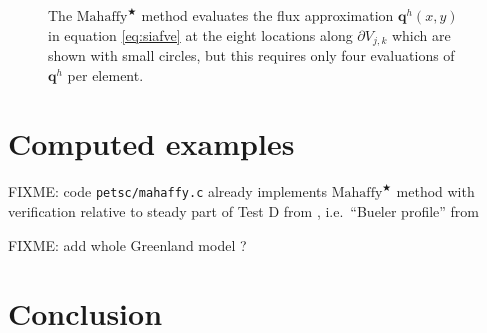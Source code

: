 \documentclass[11pt]{amsart}
\newcommand\bq{\mathbf{q}}
\newcommand{\Mstar}{$\text{Mahaffy}^{\bigstar}$\xspace}
\begin{document}
\begin{figure}[ht]
\begin{center}

\end{center}
\caption{The \Mstar method evaluates the flux approximation $\bq^h(x,y)$ in equation \eqref{eq:siafve} at the eight locations along $\partial V_{j,k}$ which are shown with small circles, but this requires only four evaluations of $\bq^h$ per element.}
\label{fig:mahaffystar}
\end{figure}


\section{Computed examples} \label{sec:examples}

FIXME: code \texttt{petsc/mahaffy.c} already implements \Mstar method with verification relative to steady part of Test D from \cite{Bueleretal2005}, i.e.~``Bueler profile'' from \cite{vanderVeen2013}

FIXME: add whole Greenland model ?

\section{Conclusion} \label{sec:conclusion}






\begin{comment}
Here is what the MPAS Land-Ice User's Manual version 3.0 says:

\begin{quote}
\small
Velocities and fluxes are calculated on the midpoint of Voronoi cell edges.  The normal component of surface slope is calculated on cell edges using surface elevation at adjacent cell centers.  The tangential component of surface slope is calculated on cell edges using surface elevation at adjacent vertices. The surface elevation at vertices is calculated from the values at adjacent cell centers using barycentric interpolation. Ice thickness on edges is calculated as the average of the adjacent cell center values (2nd-order approximation).
\end{quote}

Looking at this, and the code, I don't think they think of it as Petrov-Galerkin
\end{comment}
\end{document}
